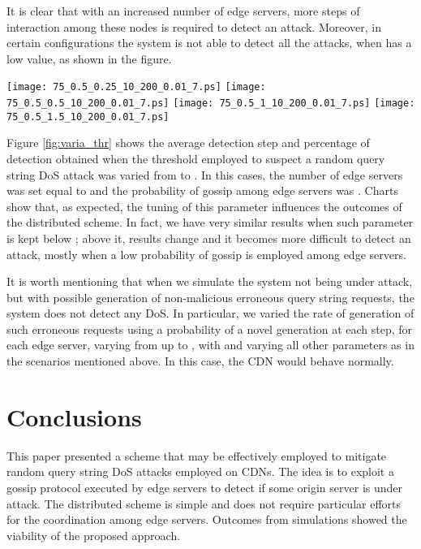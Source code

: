 \documentclass{IEEEtran}
\begin{document}
It is clear that with an increased number of edge servers, more steps of interaction among these nodes is required to detect an attack. Moreover, in certain configurations the system is not able to detect all the attacks, when  has a low value, as shown in the figure.

\begin{figure*}[t]
   \centering
   \texttt{[image: 75\_0.5\_0.25\_10\_200\_0.01\_7.ps]}
   \texttt{[image: 75\_0.5\_0.5\_10\_200\_0.01\_7.ps]}
   \texttt{[image: 75\_0.5\_1\_10\_200\_0.01\_7.ps]}
   \texttt{[image: 75\_0.5\_1.5\_10\_200\_0.01\_7.ps]}
   \caption{Average detection step and percentage of detection when varying the threshold to suspect a random query string DoS attack.}
   \label{fig:varia_thr}
 \vspace{-0.2cm}
\end{figure*}

Figure \ref{fig:varia_thr} shows the average detection step and percentage of detection obtained when the threshold employed to suspect a random query string DoS attack was varied from  to . In this cases, the number of edge servers was set equal to  and the probability of gossip among edge servers was . Charts show that, as expected, the tuning of this parameter influences the outcomes of the distributed scheme. In fact, we have very similar results when such parameter is kept below ; above it, results change and it becomes more difficult to detect an attack, mostly when a low probability of gossip  is employed among edge servers.

It is worth mentioning that when we simulate the system not being under attack, but with possible generation of non-malicious erroneous query string requests, the system does not detect any DoS. In particular, we varied the rate of generation of such erroneous requests using a probability of a novel generation at each step, for each edge server, varying from  up to , with  and varying all other parameters as in the scenarios mentioned above. In this case, the CDN would behave normally.


\section{Conclusions}
\label{sec:conc}

This paper presented a scheme that may be effectively employed to mitigate random query string DoS attacks employed on CDNs. 
The idea is to exploit a gossip protocol executed by edge servers to detect if some origin server is under attack. The distributed scheme is simple and does not require particular efforts for the coordination among edge servers. 
Outcomes from simulations showed the viability of the proposed approach.
\end{document}
